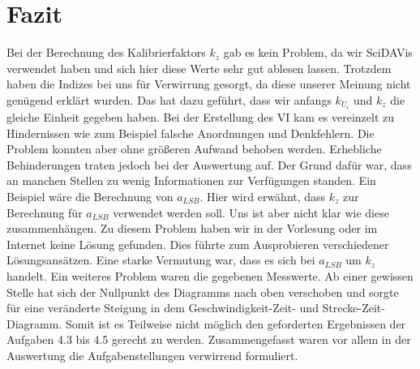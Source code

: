 \chapter{Fazit}
    Bei der Berechnung des Kalibrierfaktors \(k_{z}\) gab es kein Problem, da wir SciDAVis verwendet haben und
    sich hier diese Werte sehr gut ablesen lassen. Trotzdem haben die Indizes bei uns für Verwirrung
    gesorgt, da diese unserer Meinung nicht genügend erklärt wurden. Das hat dazu geführt, dass wir
    anfangs \(k_{U_i}\) und \(k_{z}\) die gleiche Einheit gegeben haben. Bei der Erstellung des VI kam es vereinzelt zu
    Hindernissen wie zum Beispiel falsche Anordnungen und Denkfehlern. Die Problem konnten aber
    ohne größeren Aufwand behoben werden. Erhebliche Behinderungen traten jedoch bei der
    Auswertung auf. Der Grund dafür war, dass an manchen Stellen zu wenig Informationen zur
    Verfügungen standen. Ein Beispiel wäre die Berechnung von \(a_{LSB}\). Hier wird erwähnt, dass \(k_{z}\) zur
    Berechnung für \(a_{LSB}\) verwendet werden soll. Uns ist aber nicht klar wie diese zusammenhängen.
    Zu diesem Problem haben wir in der Vorlesung oder im Internet keine Lösung gefunden. Dies führte
    zum Ausprobieren verschiedener Lösungsansätzen. Eine starke Vermutung war, dass es sich bei \(a_{LSB}\)
    um \(k_{z}\) handelt. Ein weiteres Problem waren die gegebenen Messwerte. Ab einer gewissen Stelle hat
    sich der Nullpunkt des Diagramms nach oben verschoben und sorgte für eine veränderte Steigung in
    dem Geschwindigkeit-Zeit- und Strecke-Zeit-Diagramm. Somit ist es Teilweise nicht möglich den
    geforderten Ergebnissen der Aufgaben 4.3 bis 4.5 gerecht zu werden. Zusammengefasst waren vor
    allem in der Auswertung die Aufgabenstellungen verwirrend formuliert.